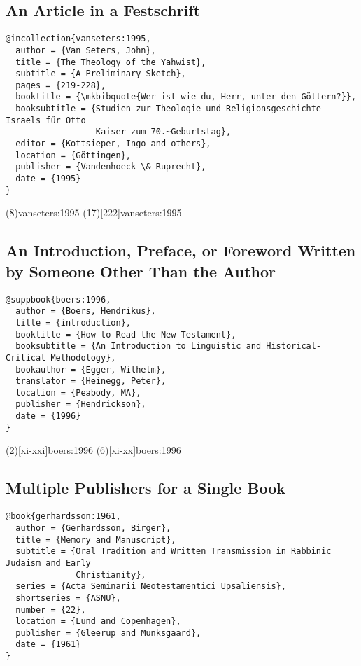 \documentclass[a4paper]{article}
\begin{document}
\subsection{An Article in a Festschrift}

\begin{verbatim}
@incollection{vanseters:1995,
  author = {Van Seters, John},
  title = {The Theology of the Yahwist},
  subtitle = {A Preliminary Sketch},
  pages = {219-228},
  booktitle = {\mkbibquote{Wer ist wie du, Herr, unter den Göttern?}},
  booksubtitle = {Studien zur Theologie und Religionsgeschichte Israels für Otto
                  Kaiser zum 70.~Geburtstag},
  editor = {Kottsieper, Ingo and others},
  location = {Göttingen},
  publisher = {Vandenhoeck \& Ruprecht},
  date = {1995}
}
\end{verbatim}

\examplecite(8){vanseters:1995}
\examplecite(17)[222]{vanseters:1995}
\examplebibliography

\subsection{An Introduction, Preface, or Foreword Written by Someone Other Than the Author}

\begin{verbatim}
@suppbook{boers:1996,
  author = {Boers, Hendrikus},
  title = {introduction},
  booktitle = {How to Read the New Testament},
  booksubtitle = {An Introduction to Linguistic and Historical-Critical Methodology},
  bookauthor = {Egger, Wilhelm},
  translator = {Heinegg, Peter},
  location = {Peabody, MA},
  publisher = {Hendrickson},
  date = {1996}
}
\end{verbatim}

\examplecite(2)[xi-xxi]{boers:1996}
\examplecite(6)[xi-xx]{boers:1996}
\examplebibliography

\subsection{Multiple Publishers for a Single Book}

\begin{verbatim}
@book{gerhardsson:1961,
  author = {Gerhardsson, Birger},
  title = {Memory and Manuscript},
  subtitle = {Oral Tradition and Written Transmission in Rabbinic Judaism and Early
              Christianity},
  series = {Acta Seminarii Neotestamentici Upsaliensis},
  shortseries = {ASNU},
  number = {22},
  location = {Lund and Copenhagen},
  publisher = {Gleerup and Munksgaard},
  date = {1961}
}
\end{verbatim}
\end{document}
